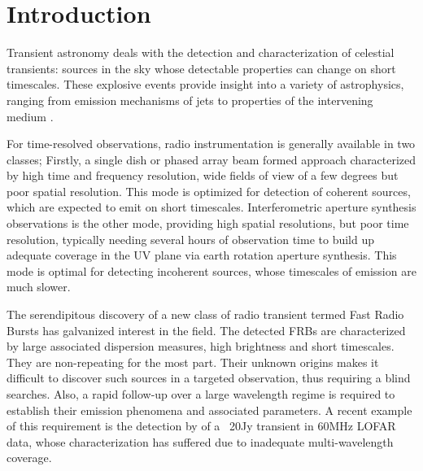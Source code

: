\documentclass{ws-jai}
\begin{document}

\section{\label{sec:Introduction}Introduction}

\noindent Transient astronomy  deals with the detection  and characterization of
celestial transients: sources in the  sky whose detectable properties can change
on short timescales.   These explosive events provide insight into  a variety of
astrophysics,  ranging from  emission mechanisms  of jets  to properties  of the
intervening  medium \citep{fender2006lofar,lazio2009dynamic,cordes2004dynamic}.  


For time-resolved observations, radio  instrumentation is generally available in
two  classes; Firstly,  a  single  dish or  phased  array  beam formed  approach
characterized by  high time and frequency  resolution, wide fields of  view of a
few degrees but poor spatial resolution. This mode is optimized for detection of
coherent    sources,     which    are     expected    to    emit     on    short
timescales. Interferometric  aperture synthesis observations is  the other mode,
providing high spatial resolutions, but  poor time resolution, typically needing
several hours of observation time to build  up adequate coverage in the UV plane
via  earth rotation  aperture synthesis.   This  mode is  optimal for  detecting
incoherent  sources,  whose  timescales  of   emission  are  much  slower.

The serendipitous discovery of a new  class of radio transient termed Fast Radio
Bursts  \citep[FRBs;][]{spitler2015fast, thornton2013population}  has galvanized
interest in the field.  The detected  FRBs are characterized by large associated
dispersion   measures,  high   brightness  and   short  timescales.    They  are
non-repeating for  the most part.  Their  unknown origins makes it  difficult to
discover  such  sources  in  a  targeted observation,  thus  requiring  a  blind
searches. Also, a rapid follow-up over  a large wavelength regime is required to
establish their emission phenomena and  associated parameters.  A recent example
of  this requirement  is the  detection by  \citet{stewart2016lofar} of  a ~20Jy
transient  in 60MHz  LOFAR  data,  whose characterization  has  suffered due  to
inadequate multi-wavelength coverage.
\end{document}
